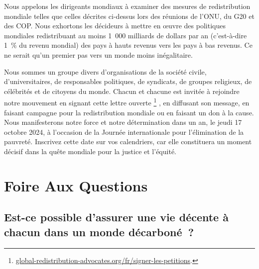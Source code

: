 \documentclass[a5paper,french]{memoir}
\begin{document}
Nous appelons les dirigeants mondiaux à examiner des mesures de redistribution mondiale telles que celles décrites ci-dessus lors des réunions de l'ONU, du G20 et des COP. Nous exhortons les décideurs à mettre en œuvre des politiques mondiales redistribuant au moins 1~000 milliards de dollars par an (c'est-à-dire 1~\% du revenu mondial) des pays à hauts revenus vers les pays à bas revenus. Ce ne serait qu'un premier pas vers un monde moins inégalitaire.

Nous sommes un groupe divers d'organisations de la société civile, d'universitaires, de responsables politiques, de syndicats, de groupes religieux, de célébrités et de citoyens du monde. Chacun et chacune est invitée à rejoindre notre mouvement en signant cette lettre ouverte
\footnote{\href{https://global-redistribution-advocates.org/fr/signer-les-petitions/?238=true}{global-redistribution-advocates.org/fr/signer-les-petitions}.}%
, en diffusant son message, en faisant campagne pour la redistribution mondiale ou en faisant un don à la cause. Nous manifesterons notre force et notre détermination dans un an, le jeudi 17 octobre 2024, à l'occasion de la Journée internationale pour l'élimination de la pauvreté. Inscrivez cette date sur vos calendriers, car elle constituera un moment décisif dans la quête mondiale pour la justice et l'équité.


\chapter{Foire Aux Questions\label{ch:faq}}

\section*{\normalsize Est-ce possible d'assurer une vie décente à chacun dans un monde décarboné~?}\label{q:decent}
\end{document}
